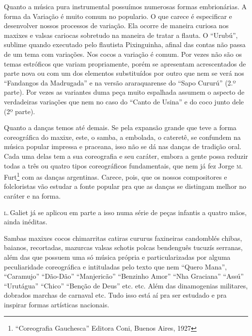 Quanto a música pura instrumental possuímos numerosas formas
embrionárias. A forma da Variação é muito comum no populario. O que
carece é especificar e desenvolver nossos processos de variação. Ela
ocorre de maneira curiosa nos maxixes e valsas cariocas sobretudo na
maneira de tratar a flauta. O ``Urubú'', sublime quando executado pelo
flautista Pixinguinha, afinal das contas não passa de um tema com
variações. Nos cocos a variação é comum. Por vezes não são os temas
estróficos que variam propriamente, porém se apresentam acrescentados de
parte nova ou com um dos elementos substituídos por outro que nem se
verá nos ``Fandangos da Madrugada'' e na versão araraquarense do ``Sapo
Cururú'' (2.º parte). Por vezes as variantes duma peça muito espalhada
assumem o aspecto de verdadeiras variações que nem no caso do ``Canto de
Usina'' e do coco junto dele (2º parte).

Quanto a danças temos até demais. Se pela expansão grande que teve a
forma coreográfica do maxixe, este, o samba, a embolada, o cateretê, se
confundem na música popular impressa e praceana, isso não se dá nas
danças de tradição oral. Cada uma delas tem a sua coreografia e seu
caráter, embora a gente possa reduzir todas a três ou quatro tipos
coreográficos fundamentais, que nem já fez Jorge \textsc{m}.\,Furt\footnote{``Coreografia
Gauchesca'' Editora Coni, Buenos Aires, 1927} com as danças argentinas.
Carece, pois, que os nossos compositores e folcloristas vão estudar a
fonte popular pra que as danças se distingam melhor no caráter e na
forma.

\textsc{l}.\,Galiet já se aplicou em parte a isso numa série de peças infantis a
quatro mãos, ainda inéditas.

Sambas maxixes cocos chimarritas catiras cururus faxineiras candomblés
chibas, baianos, recortadas, mazurcas valsas schotis polcas 
bendenguês tucuzís serranas, além das que possuem uma só
música própria e particularizadas por alguma peculiaridade coreográfica
e intituladas pelo texto que nem ``Quero Mana'', 
``Caramujo'' ``Dão-Dão'' ``Manjericão'' ``Benzinho Amor'' ``Nha Graciana'' ``Assú''
``Urutágua'' ``Chico'' ``Benção de Deus'' etc. etc. Além das dinamogenias
militares, dobrados marchas de carnaval etc. Tudo isso está aí pra ser
estudado e pra inspirar formas artísticas nacionais.

